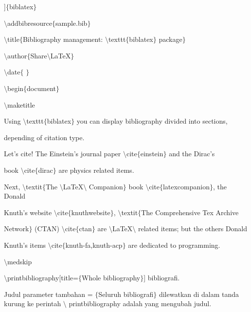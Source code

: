\begin{itemize}
]$ \{ $biblatex$ \} $\par

\vspace{\baselineskip}
$\setminus$addbibresource$ \{ $sample.bib$ \} $\par

$\setminus$title$ \{ $Bibliography management: $\setminus$texttt$ \{ $biblatex$ \} $ package$ \} $\par

$\setminus$author$ \{ $Share$\setminus$LaTeX$ \} $\par

$\setminus$date$ \{ $ $ \} $\par

$\setminus$begin$ \{ $document$ \} $\par

$\setminus$maketitle\par
\vspace{\baselineskip}
Using $\setminus$texttt$ \{ $biblatex$ \} $ you can display bibliography divided into sections, \par

depending of citation type. \par
\vspace{\baselineskip}
Let's cite! The Einstein's journal paper $\setminus$cite$ \{ $einstein$ \} $ and the Dirac's \par

book $\setminus$cite$ \{ $dirac$ \} $ are physics related items. \par

Next, $\setminus$textit$ \{ $The $\setminus$LaTeX$\setminus$ Companion$ \} $ book $\setminus$cite$ \{ $latexcompanion$ \} $, the Donald \par
\vspace{\baselineskip}
Knuth's website $\setminus$cite$ \{ $knuthwebsite$ \} $, $\setminus$textit$ \{ $The Comprehensive Tex Archive \par

Network$ \} $ (CTAN) $\setminus$cite$ \{ $ctan$ \} $ are $\setminus$LaTeX$\setminus$ related items; but the others Donald \par

Knuth's items $\setminus$cite$ \{ $knuth-fa,knuth-acp$ \} $ are dedicated to programming. \par

$\setminus$medskip \par

$\setminus$printbibliography[title=$ \{ $Whole bibliography$ \} $] bibliografi.\par
\vspace{\baselineskip}
Judul parameter tambahan = $ \{ $Seluruh bibliografi$ \} $ dilewatkan di dalam tanda kurung ke perintah $\setminus$ printbibliography adalah yang mengubah judul.\par


\end{itemize}
